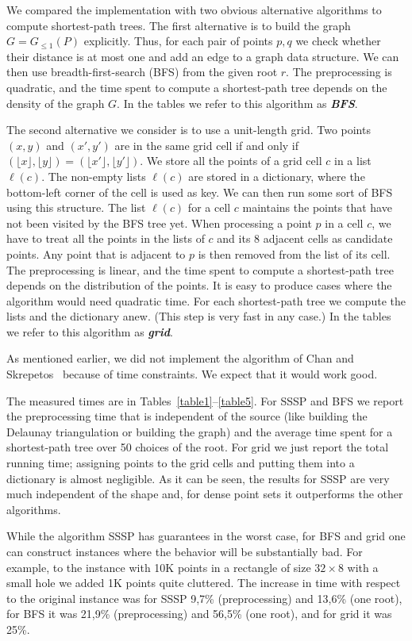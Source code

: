 \documentclass[a4paper,11pt]{article}
\newcommand{\GG}{\ensuremath{G_{\le 1}}}
\def\DEF#1{\textbf{\emph{#1}}}
\let\le\leqslant
\begin{document}
We compared the implementation with two obvious alternative algorithms to
compute shortest-path trees.
The first alternative is to build the graph $G=\GG(P)$ explicitly. 
Thus, for each pair of points $p,q$ we check whether their distance is
at most one and add an edge to a graph data structure.
We can then use breadth-first-search (BFS) from the given root $r$.
The preprocessing is quadratic, and the time spent to compute
a shortest-path tree depends on the density of the graph $G$.
In the tables we refer to this algorithm as \DEF{BFS}.

The second alternative we consider is to use a unit-length grid. 
Two points $(x,y)$ and $(x',y')$ are in the same grid cell
if and only if 
$(\lfloor x\rfloor ,\lfloor y\rfloor)=(\lfloor x'\rfloor ,\lfloor y'\rfloor)$.
We store all the points of a grid cell $c$ in a list $\ell(c)$.
The non-empty lists $\ell(c)$ are stored in a dictionary,
where the bottom-left corner of the cell is used as key.
We can then run some sort of BFS using this structure. 
The list $\ell(c)$ for a cell $c$ maintains the points that
have not been visited by the BFS tree yet. When processing
a point $p$ in a cell $c$, we have to treat all the points 
in the lists of $c$ and its $8$ adjacent cells as candidate points.
Any point that is adjacent to $p$ is then removed from the list of its cell. 
The preprocessing is linear, and the time spent to compute
a shortest-path tree depends on the distribution of the points.
It is easy to produce cases where the algorithm would need quadratic time.
For each shortest-path tree we compute the lists and the dictionary anew.
(This step is very fast in any case.)
In the tables we refer to this algorithm as \DEF{grid}.

As mentioned earlier, we did not implement the algorithm of Chan and Skrepetos~\cite{ChanS16}
because of time constraints. We expect that it would work good.

The measured times are in Tables~\ref{table1}--\ref{table5}.
For SSSP and BFS we report the preprocessing time that is independent of the source
(like building the Delaunay triangulation or building the graph) and the average
time spent for a shortest-path tree over 50 choices of the root.
For grid we just report the total running time; assigning points to
the grid cells and putting them into a dictionary is almost negligible.
As it can be seen, the results for SSSP are very much independent of the shape and,
for dense point sets it outperforms the other algorithms.

While the algorithm SSSP has guarantees in the worst case,
for BFS and grid one can construct instances 
where the behavior will be substantially bad. 
For example, to the instance with 10K points in a rectangle of size $32\times 8$ 
with a small hole we added 1K points quite cluttered. 
The increase in time with respect to the original instance 
was for SSSP 9,7\% (preprocessing) and 13,6\% (one root), for BFS it was
21,9\% (preprocessing) and 56,5\% (one root), and for grid it was 25\%.
\end{document}
